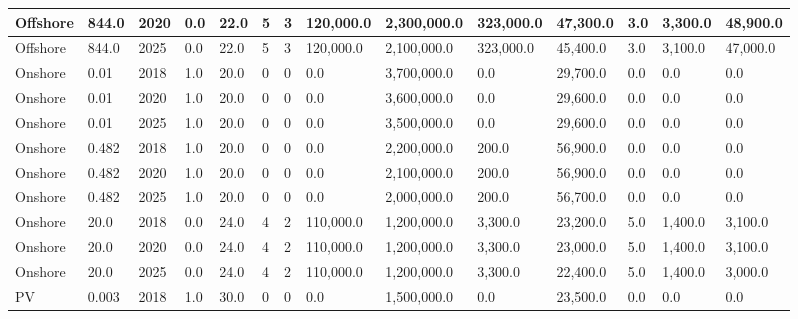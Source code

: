 \documentclass[sigconf]{acmart}
\begin{document}
\begin{table*}[]
\begin{tabularx}{\linewidth}{|p{}|l|x|l|l|l|l|l|l|l|l|l|l|l|}
Offshore                      & 844.0       & 2020             & 0.0    & 22.0 & 5     & 3     & 120,000.0 & 2,300,000.0 & 323,000.0 & 47,300.0 & 3.0   & 3,300.0  & 48,900.0  \\ \hline
Offshore                      & 844.0       & 2025             & 0.0    & 22.0 & 5     & 3     & 120,000.0 & 2,100,000.0 & 323,000.0 & 45,400.0 & 3.0   & 3,100.0  & 47,000.0  \\ \hline
Onshore                       & 0.01        & 2018             & 1.0    & 20.0 & 0     & 0     & 0.0       & 3,700,000.0 & 0.0       & 29,700.0 & 0.0   & 0.0      & 0.0       \\ \hline
Onshore                       & 0.01        & 2020             & 1.0    & 20.0 & 0     & 0     & 0.0       & 3,600,000.0 & 0.0       & 29,600.0 & 0.0   & 0.0      & 0.0       \\ \hline
Onshore                       & 0.01        & 2025             & 1.0    & 20.0 & 0     & 0     & 0.0       & 3,500,000.0 & 0.0       & 29,600.0 & 0.0   & 0.0      & 0.0       \\ \hline
Onshore                       & 0.482       & 2018             & 1.0    & 20.0 & 0     & 0     & 0.0       & 2,200,000.0 & 200.0     & 56,900.0 & 0.0   & 0.0      & 0.0       \\ \hline
Onshore                       & 0.482       & 2020             & 1.0    & 20.0 & 0     & 0     & 0.0       & 2,100,000.0 & 200.0     & 56,900.0 & 0.0   & 0.0      & 0.0       \\ \hline
Onshore                       & 0.482       & 2025             & 1.0    & 20.0 & 0     & 0     & 0.0       & 2,000,000.0 & 200.0     & 56,700.0 & 0.0   & 0.0      & 0.0       \\ \hline
Onshore                       & 20.0        & 2018             & 0.0    & 24.0 & 4     & 2     & 110,000.0 & 1,200,000.0 & 3,300.0   & 23,200.0 & 5.0   & 1,400.0  & 3,100.0   \\ \hline
Onshore                       & 20.0        & 2020             & 0.0    & 24.0 & 4     & 2     & 110,000.0 & 1,200,000.0 & 3,300.0   & 23,000.0 & 5.0   & 1,400.0  & 3,100.0   \\ \hline
Onshore                       & 20.0        & 2025             & 0.0    & 24.0 & 4     & 2     & 110,000.0 & 1,200,000.0 & 3,300.0   & 22,400.0 & 5.0   & 1,400.0  & 3,000.0   \\ \hline
PV                            & 0.003       & 2018             & 1.0    & 30.0 & 0     & 0     & 0.0       & 1,500,000.0 & 0.0       & 23,500.0 & 0.0   & 0.0      & 0.0       \\ \hline

\end{tabularx}
\end{table*}
\end{document}
